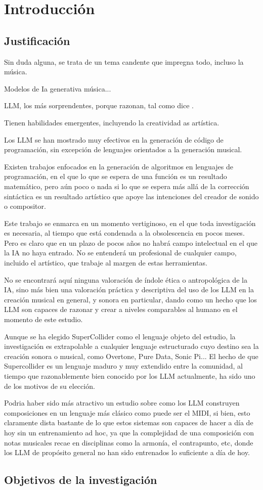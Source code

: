 \chapter{Introducción}
\section{Justificación}

Sin duda alguna, se trata de un tema candente que impregna todo, incluso la música.

Modelos de Ia generativa música...

LLM, los más sorprendentes, porque razonan, tal como dice \cite{chenTeachingLargeLanguage2023}.

Tienen habilidades emergentes, incluyendo la creatividad as artística.

Los LLM se han mostrado muy efectivos en la generación de código de programación, sin excepción de lenguajes orientados a la generación musical. 

Existen trabajos enfocados en la generación de algoritmos en lenguajes de programación, en el que lo que se espera de una función es un resultado matemático, pero aún poco o nada si lo que se espera más allá de la corrección sintáctica es un resultado artístico que apoye las intenciones del creador de sonido o compositor.

Este trabajo se enmarca en un momento vertiginoso, en el que toda investigación es necesaria, al tiempo que está condenada a la obsolescencia en pocos meses. Pero es claro que en un plazo de pocos años no habrá campo intelectual en el que la IA no haya entrado. No se entenderá un profesional de cualquier campo, incluido el artístico, que trabaje al margen de estas herramientas.

No se encontrará aquí ninguna valoración de índole ética o antropológica de la IA, sino más bien una valoración práctica y descriptiva del uso de los LLM en la creación musical en general, y sonora en particular, dando como un hecho que los LLM son capaces de razonar y crear a niveles comparables al humano en el momento de este estudio.

Aunque se ha elegido SuperCollider como el lenguaje objeto del estudio, la investigación es extrapolable a cualquier lenguaje estructurado cuyo destino sea la creación sonora o musical, como Overtone, Pure Data, Sonic Pi... El hecho de que Supercollider es un lenguaje maduro y muy extendido entre la comunidad, al tiempo que razonablemente bien conocido por los LLM actualmente, ha sido uno de los motivos de su elección.

Podria haber sido más atractivo un estudio sobre como los LLM construyen composiciones en un lenguaje más clásico como puede ser el MIDI, si bien, esto claramente dista bastante de lo que estos sistemas son capaces de hacer a día de hoy sin un entrenamiento ad hoc, ya que la complejidad de una composición con notas musicales recae en disciplinas como la armonía, el contrapunto, etc, donde los LLM de propósito general no han sido entrenados lo suficiente a día de hoy.

\section{Objetivos de la investigación}
